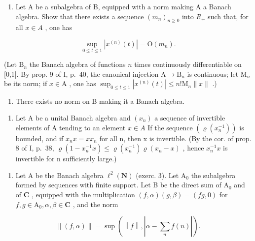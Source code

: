 \begin{enumerate}
\def\labelenumi{\alph{enumi})}
\tightlist
\item
  Let A be a subalgebra of B, equipped with a norm making A a Banach algebra. Show that there exists a sequence \((m_{n})_{n\geqslant0}\) into \(R_{+}\) such that, for all \(x\in A\) , one has
\end{enumerate}

\[
\sup _ {0 \leqslant t \leqslant 1} | x ^ {(n)} (t) | = \mathrm{O} (m _ {n}).
\]

(Let \(\mathrm{B}_n\) the Banach algebra of functions \(n\) times continuously differentiable on {[}0,1{]}. By prop. 9 of I, p.~40, the canonical injection \(\mathrm{A} \to \mathrm{B}_n\) is continuous; let \(\mathrm{M}_n\) be its norm; if \(x \in \mathrm{A}\) , one has \(\sup_{0 \leq t \leq 1} |x^{(n)}(t)| \leqslant n!\mathrm{M}_n \| x\|\) .)

\begin{enumerate}
\def\labelenumi{\alph{enumi})}
\setcounter{enumi}{1}
\tightlist
\item
  There exists no norm on B making it a Banach algebra.
\end{enumerate}

\begin{enumerate}
\def\labelenumi{\arabic{enumi})}
\setcounter{enumi}{11}
\tightlist
\item
  Let A be a unital Banach algebra and \((x_{n})\) a sequence of invertible elements of A tending to an element \(x \in A\) If the sequence \((\varrho(x_{n}^{-1}))\) is bounded, and if \(x_{n}x = xx_{n}\) for all n, then x is invertible. (By the cor. of prop. 8 of I, p.~38, \(\varrho(1 - x_{n}^{-1}x) \leqslant \varrho(x_{n}^{-1})\varrho(x_{n} - x)\) , hence \(x_{n}^{-1}x\) is invertible for n sufficiently large.)
\end{enumerate}

\begin{enumerate}
\def\labelenumi{¶ \arabic{enumi})}
\setcounter{enumi}{12}
\tightlist
\item
  Let A be the Banach algebra \(\ell^{2}(\mathbf{N})\) (exerc. 3). Let \(\mathrm{A}_{0}\) the subalgebra formed by sequences with finite support. Let B be the direct sum of \(\mathrm{A}_{0}\) and of \(\mathbf{C}\) , equipped with the multiplication \((f,\alpha)(g,\beta)=(fg,0)\) for \(f,g\in\mathrm{A}_{0},\alpha,\beta\in\mathbf{C}\) , and the norm
\end{enumerate}

\[
\left\| (f, \alpha) \right\| = \sup \left(\left\| f \right\|, \left| \alpha - \sum_ {n} f (n) \right|\right).
\]

